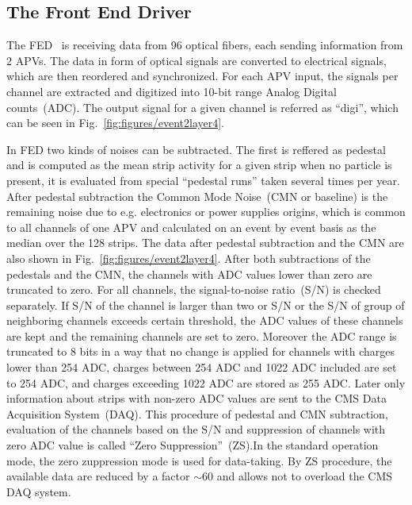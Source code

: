 
\subsection{The Front End Driver}


The FED~\cite{Baird:2002wg} is receiving data from 96 optical fibers, each sending information from 2 APVs. The data in form of optical signals are converted to electrical signals, which are then reordered and synchronized. For each APV input, the signals per channel are extracted and digitized into 10-bit range Analog Digital counts~(ADC). The output signal for a given channel is referred as ``digi'', which can be seen in Fig.~\ref{fig:figures/event2layer4}. 

In FED two kinds of noises can be subtracted. The first is reffered as pedestal and is computed as the mean strip activity for a given strip when no particle is present, it is evaluated from special ``pedestal runs'' taken several times per year. After pedestal subtraction the Common Mode Noise~(CMN or baseline) is the remaining noise due to e.g. electronics or power supplies origins, which is common to all channels of one APV and calculated on an  event by event basis as the median over the 128 strips. The data after pedestal subtraction and the CMN are also shown in Fig.~\ref{fig:figures/event2layer4}. After both subtractions of the pedestals and the CMN, the channels with ADC values lower than zero are truncated to zero. For all channels, the signal-to-noise ratio~(S/N) is checked separately. If S/N of the channel is larger than two or S/N or the S/N of group of neighboring channels exceeds certain threshold, the ADC values of these channels are kept and the remaining channels are set to zero. Moreover the ADC range is truncated to 8 bits in a way that no change is applied for channels with charges lower than 254 ADC, charges between 254 ADC and 1022 ADC included are set to 254 ADC, and charges exceeding 1022 ADC are stored as 255 ADC. Later only information about strips with non-zero ADC values are sent to the CMS Data Acquisition System~(DAQ).  This procedure of pedestal and CMN subtraction, evaluation of the channels based on the S/N and suppression of channels with zero ADC value is called ``Zero Suppression''~(ZS).In the standard operation mode, the zero zuppression mode is used for data-taking. By ZS procedure, the available data are reduced by a factor $\sim$60 and allows not to overload the CMS DAQ system.

